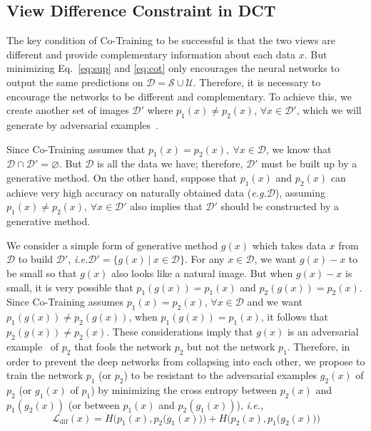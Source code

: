 \documentclass[runningheads]{llncs}
\begin{document}
\vspace{-0.08in}\subsection{View Difference Constraint in DCT}
The key condition of Co-Training to be successful is that the two views are different and provide complementary information about each data $x$.
But minimizing Eq.~\ref{eq:sup} and \ref{eq:cot} only encourages the neural networks to output the same predictions on $\mathcal{D}=\mathcal{S}\cup\mathcal{U}$.
Therefore, it is necessary to encourage the networks to be different and complementary.
To achieve this, we create another set of images $\mathcal{D'}$ where $p_1(x)\neq p_2(x)$, $\forall x\in\mathcal{D'}$, which we will generate by adversarial examples~\cite{adv,adv2}.

Since Co-Training assumes that $p_1(x)=p_2(x),~\forall x\in\mathcal{D}$, we know that $\mathcal{D}\cap\mathcal{D'}=\varnothing$.
But $\mathcal{D}$ is all the data we have; therefore, $\mathcal{D'}$ must be built up by a generative method.
On the other hand, suppose that $p_1(x)$ and $p_2(x)$ can achieve very high accuracy on naturally obtained data (\textit{e.g.}$\mathcal{D}$), assuming $p_1(x)\neq p_2(x)$, $\forall x\in\mathcal{D}'$ also implies that $\mathcal{D'}$ should be constructed by a generative method.

We consider a simple form of generative method $g(x)$ which takes data $x$ from $\mathcal{D}$ to build $\mathcal{D'}$, \textit{i.e.}$\mathcal{D}'=\{g(x)~|~x\in\mathcal{D}\}$.
For any $x\in\mathcal{D}$, we want $g(x) - x$ to be small so that $g(x)$ also looks like a natural image.
But when $g(x) - x$ is small, it is very possible that $p_1(g(x)) = p_1(x)$ and $p_2(g(x))=p_2(x)$.
Since Co-Training assumes $p_1(x)=p_2(x)$, $\forall x\in\mathcal{D}$ and we want $p_1(g(x))\neq p_2(g(x))$,
when $p_1(g(x))=p_1(x)$, it follows that $p_2(g(x))\neq p_2(x)$.
These considerations imply that $g(x)$ is an adversarial example~\cite{adv} of $p_2$ that fools the network $p_2$ but not the network $p_1$.
Therefore, in order to prevent the deep networks from collapsing into each other, we propose to train the network $p_1$ (or $p_2$) to be resistant to the adversarial examples $g_2(x)$ of $p_2$ (or $g_1(x)$ of $p_1$) by minimizing the cross entropy between $p_2(x)$ and $p_1(g_2(x))$ (or between $p_1(x)$ and $p_2(g_1(x))$), \textit{i.e.,}\begin{equation}\label{eq:dif}
  \mathcal{L}_{\text{dif}}(x) = H\Big(p_1(x), p_2\big(g_1(x)\big)\Big) + H\Big(p_2(x), p_1\big(g_2(x)\big)\Big)
\end{equation}
\end{document}
